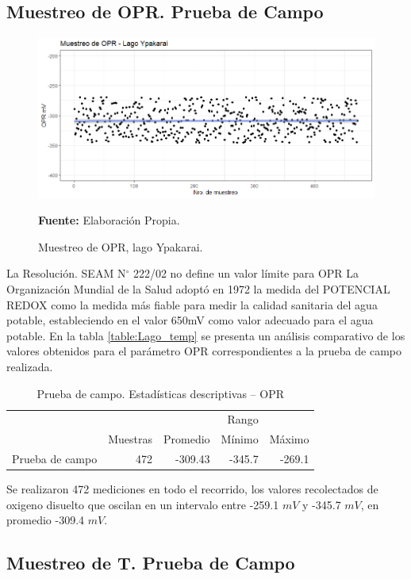 \subsection{Muestreo de OPR. Prueba de Campo}

\begin{figure}[H]
        \centering
        \includegraphics[width=0.75\linewidth]{Imagenes/cap4/OPR_LAGO.png}
        \caption {Muestreo de OPR, lago Ypakarai. }{\textbf{Fuente:}
        Elaboraci\'on Propia. }
        \label{fig:Lago_opr}
\end{figure}
La Resoluci\'on. SEAM N$ ^{\circ}$ 222/02 no define un valor límite para OPR La Organización Mundial de la Salud adoptó en 1972 la medida del POTENCIAL REDOX como la medida más fiable para medir la calidad sanitaria del agua potable, estableciendo en \cite{OPR_10665-39989} el valor 650mV como valor adecuado para el agua potable.
En la tabla \ref{table:Lago_temp} se presenta un an\'alisis comparativo de los valores obtenidos para el par\'ametro OPR correspondientes a la prueba de campo realizada. 
\begin{table}[H]
\centering
\caption{Prueba de campo. Estadísticas descriptivas – OPR}
\label{table:Lago_opr}
\begin{tabular}{lrrrr}
\toprule
          & \multicolumn{3}{r}{Rango} \\  \cline{4-5}
          & Muestras & Promedio & Mínimo & Máximo \\
\midrule
Prueba de campo  &      472 &  -309.43 & -345.7 & -269.1 \\
\bottomrule
\end{tabular}
\end{table}

Se realizaron 472 mediciones en todo el recorrido, los valores recolectados de oxigeno disuelto que oscilan en  un intervalo entre -259.1 $mV$ y -345.7 $mV$, en promedio -309.4 $mV$.

\subsection{Muestreo de T. Prueba de Campo}

